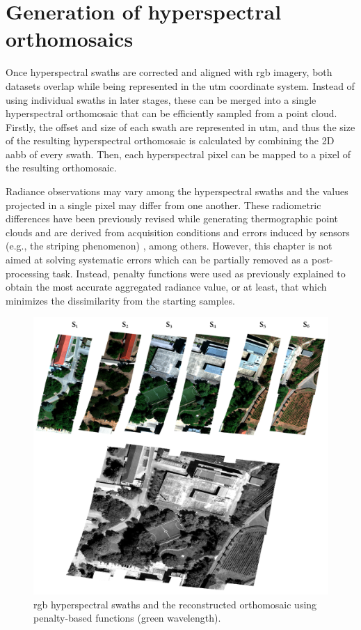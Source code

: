 \section{Generation of hyperspectral orthomosaics}

Once hyperspectral swaths are corrected and aligned with \acrshort{rgb} imagery, both datasets overlap while being represented in the \acrshort{utm} coordinate system. Instead of using individual swaths in later stages, these can be merged into a single hyperspectral orthomosaic that can be efficiently sampled from a point cloud. Firstly, the offset and size of each swath are represented in \acrshort{utm}, and thus the size of the resulting hyperspectral orthomosaic is calculated by combining the 2D \acrshort{aabb} of every swath. Then, each hyperspectral pixel can be mapped to a pixel of the resulting orthomosaic. 

Radiance observations may vary among the hyperspectral swaths and the values projected in a single pixel may differ from one another. These radiometric differences have been previously revised while generating thermographic point clouds and are derived from acquisition conditions and errors induced by sensors (e.g., the striping phenomenon) \cite{pu_hyperspectral_2017}, among others. However, this chapter is not aimed at solving systematic errors which can be partially removed as a post-processing task. Instead, penalty functions were used as previously explained to obtain the most accurate aggregated radiance value, or at least, that which minimizes the dissimilarity from the starting samples. 

\begin{figure}[bt]
    \centering
    \includegraphics[width=\linewidth]{figs/hyper_point_cloud/orthomosaic.png}
	\caption{\acrshort{rgb} hyperspectral swaths and the reconstructed orthomosaic using penalty-based functions (green wavelength). }
	\label{fig:hyper_band_fusion}
\end{figure}

